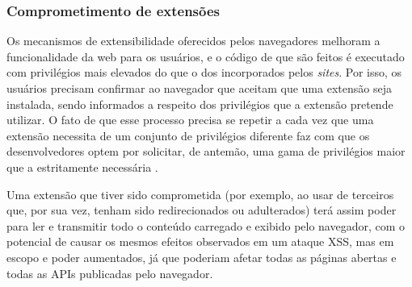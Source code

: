 
\subsubsection{Comprometimento de extensões}
Os mecanismos de extensibilidade oferecidos pelos navegadores melhoram a funcionalidade da web para os usuários, e o código de que são feitos é executado com privilégios mais elevados do que o dos \scripts incorporados pelos \textit{sites}. Por isso, os usuários precisam confirmar ao navegador que aceitam que uma extensão seja instalada, sendo informados a respeito dos privilégios que a extensão pretende utilizar. O fato de que esse processo precisa se repetir a cada vez que uma extensão necessita de um conjunto de privilégios diferente faz com que os desenvolvedores optem por solicitar, de antemão, uma gama de privilégios maior que a estritamente necessária \cite{Heule2015_Most_Dangerous_Code}.

Uma extensão que tiver sido comprometida (por exemplo, ao usar \scripts de terceiros que, por sua vez, tenham sido redirecionados ou adulterados) terá assim poder para ler e transmitir todo o conteúdo carregado e exibido pelo navegador, com o potencial de causar os mesmos efeitos observados em um ataque XSS, mas em escopo e poder aumentados, já que poderiam afetar todas as páginas abertas e todas as APIs publicadas pelo navegador.
